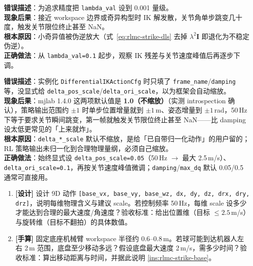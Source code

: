 \begin{pitfall}
\textbf{错误描述}：为追求精度把 \verb|lambda_val| 设到 0.001 量级。\\
\textbf{现象后果}：接近 workspace 边界或奇异构型时 IK 解发散，关节角单步跳变几十度，触发关节限位终止甚至 NaN。\\
\textbf{根本原因}：小奇异值被伪逆放大（式~\eqref{eq:rlmc-strike-dls} 去掉 $\lambda^2\mathbf{I}$ 即退化为不稳定伪逆）。\\
\textbf{正确做法}：从 \verb|lambda_val=0.1| 起步，观察 IK 残差与关节速度峰值后再逐步下调。
\end{pitfall}

\begin{pitfall}
\textbf{错误描述}：实例化 \verb|DifferentialIKActionCfg| 时只填了 \verb|frame_name|/\verb|damping| 等，没显式给 \verb|delta_pos_scale|/\verb|delta_ori_scale|，以为框架会自动缩放。\\
\textbf{现象后果}：mjlab 1.4.0 这两项默认值是 \textbf{1.0（不缩放）}（实测 introspection 确认），策略输出范围约 $\pm 1$ 时单步位置增量就到 $\pm 1$\,m、姿态增量到 $\pm 1$\,rad，50\,Hz 下等于要求关节瞬间跳变，第一帧就触发关节限位终止甚至 NaN——比 damping 设太低更常见的「上来就炸」。\\
\textbf{根本原因}：\verb|delta_*_scale| 默认不缩放，是给「已自带归一化动作」的用户留的；RL 策略输出未归一化到合理物理量纲，必须自己缩放。\\
\textbf{正确做法}：始终显式设 \verb|delta_pos_scale=0.05|（50\,Hz $\to$ 最大 2.5\,m/s）、\verb|delta_ori_scale=0.1|，再按关节速度峰值微调；\verb|damping|/\verb|max_dq| 默认 0.05/0.5 通常可直接用。
\end{pitfall}

\begin{practice}[本节动手任务]
\begin{enumerate}
  \item \textbf{[设计]} 设计 9D 动作 \verb|[base_vx, base_vy, base_wz, dx, dy, dz, drx, dry, drz]|，说明每维物理含义与建议 scale。若控制频率 50\,Hz，每维 scale 设多少才能达到合理的最大速度/角速度？验收标准：给出位置维（目标 $\le 2.5$\,m/s）与旋转维（目标不翻拍）的具体数值。
  \item \textbf{[手算]} 固定底座机械臂 workspace 半径约 0.6--0.8\,m。若球可能到达机器人左右 2\,m 范围，底盘至少移动多远？假设底盘最大速度 2\,m/s，需多少时间？验收标准：算出移动距离与时间，并据此说明 \cref{ins:rlmc-strike-base}。
\end{enumerate}
\end{practice}

